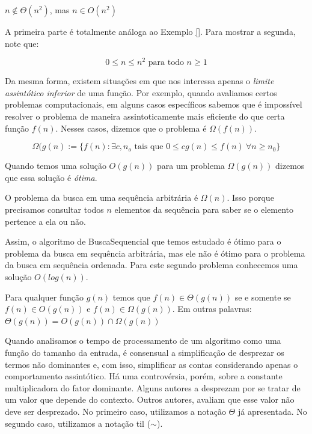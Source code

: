   \begin{example}
    $n \notin \Theta(n^2)$, mas $n \in O(n^2)$

    A primeira parte é totalmente análoga ao Exemplo \ref{}.
    Para mostrar a segunda, note que:

    \begin{displaymath}
     0 \leq n \leq n^2 \textrm{ para todo } n \geq 1
    \end{displaymath}
  \end{example}

  Da mesma forma, existem situações em que nos interessa apenas o {\em limite assintótico inferior} de uma função.
  Por exemplo, quando avaliamos certos problemas computacionais, em alguns casos específicos sabemos que é impossível resolver o problema de maneira assintoticamente mais eficiente do que certa função $f(n)$.
  Nesses casos, dizemos que o problema é $\Omega(f(n))$.

  \begin{displaymath}
    \Omega(g(n) := \{f(n) : \exists c, n_o \textrm{ tais que } 0 \leq cg(n) \leq f(n)\ \forall n \geq n_0 \}
  \end{displaymath}

  Quando temos uma solução $O(g(n))$ para um problema $\Omega(g(n))$ dizemos que essa solução é {\em ótima}. 

  \begin{example}
    O problema da busca em uma sequência arbitrária é $\Omega(n)$.
    Isso porque precisamos consultar todos $n$ elementos da sequência para saber se o elemento pertence a ela ou não.

    Assim, o algoritmo de BuscaSequencial que temos estudado é ótimo para o problema da busca em sequência arbitrária, mas ele não é ótimo para o problema da busca em sequência ordenada.
    Para este segundo problema conhecemos uma solução $O(log(n))$.
  \end{example}

  \begin{theorem}
    Para qualquer função $g(n)$ temos que $f(n) \in \Theta(g(n))$ se e somente se $f(n) \in O(g(n))$ e $f(n) \in \Omega(g(n))$. Em outras palavras: $\Theta(g(n)) = O(g(n)) \cap \Omega(g(n))$
  \end{theorem}

  Quando analisamos o tempo de processamento de um algoritmo como uma função do tamanho da entrada, é consensual a simplificação de desprezar os termos não dominantes e, com isso, simplificar as contas considerando apenas o comportamento assintótico.
  Há uma controvérsia, porém, sobre a constante multiplicadora do fator dominante.
  Alguns autores a desprezam por se tratar de um valor que depende do contexto.
  Outros autores, avaliam que esse valor não deve ser desprezado.
  No primeiro caso, utilizamos a notação $\Theta$ já apresentada.
  No segundo caso, utilizamos a notação til ($\sim$).

